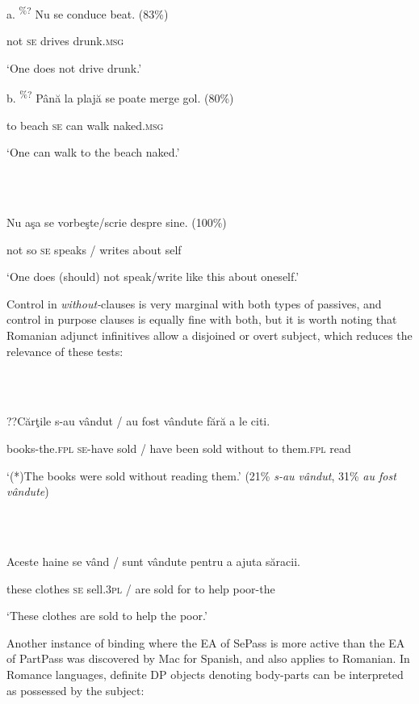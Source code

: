 \documentclass[output=paper]{langsci/langscibook}
\begin{document}
          a.    \textsuperscript{\%?}  Nu se conduce beat.              (83\%)  

        not \textsc{se} drives    drunk.\textsc{msg}

          ‘One does not drive drunk.’

b.\textsuperscript{    \%?}  Până la plajă  se poate merge gol.            (80\%)  

           to        beach \textsc{se} can   walk   naked.\textsc{msg}

           ‘One can walk to the beach naked.’

\ea%
    \label{ex:key:44}
    \gll\\
        \\
    \glt
    \z

          Nu  aşa  se vorbeşte/scrie   despre sine.            (100\%)    

not so   \textsc{se} speaks  / writes about  self

‘One does (should) not speak/write like this about oneself.’

Control in \textit{without-}clauses is very marginal with both types of passives, and control in purpose clauses is equally fine with both, but it is worth noting that Romanian adjunct infinitives allow a disjoined or overt subject, which reduces the relevance of these tests:

\ea%
    \label{ex:key:45}
    \gll\\
        \\
    \glt
    \z

         ??Cărţile            s-au    vândut /  au     fost vândute fără       a   le            citi.

books-the.\textsc{fpl} \textsc{se-}have sold /    have been sold      without to them.\textsc{fpl} read

‘(*)The books were sold without reading them.’ (21\% \textit{s-au vândut}, 31\% \textit{au fost vândute})

\ea%
    \label{ex:key:46}
    \gll\\
        \\
    \glt
    \z

          Aceste  haine   se vând     / sunt vândute pentru a ajuta săracii.

these    clothes \textsc{se} sell.\textsc{3pl}  / are sold       for      to help poor-the

‘These clothes are sold to help the poor.’

Another instance of binding where the EA of SePass is more active than the EA of PartPass was discovered by Mac\citet{Donald2017} for Spanish, and also applies to Romanian. In Romance languages, definite DP objects denoting body-parts can be interpreted as possessed by the subject:
\end{document}
